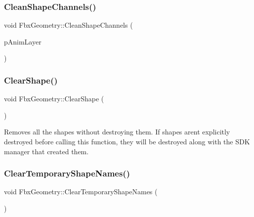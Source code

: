 \mbox{\label{class_fbx_geometry_ad7d877cff6187c93064395a71b25ecce}} 
\subsubsection{\texorpdfstring{Clean\+Shape\+Channels()}{CleanShapeChannels()}}
{\footnotesize\ttfamily void Fbx\+Geometry\+::\+Clean\+Shape\+Channels (\begin{DoxyParamCaption}\item[{\hyperlink{class_fbx_anim_layer}{Fbx\+Anim\+Layer} $\ast$}]{p\+Anim\+Layer }\end{DoxyParamCaption})}

\mbox{\label{class_fbx_geometry_a6f5e46228d45b12e4f513abb56b8226d}} 
\subsubsection{\texorpdfstring{Clear\+Shape()}{ClearShape()}}
{\footnotesize\ttfamily void Fbx\+Geometry\+::\+Clear\+Shape (\begin{DoxyParamCaption}{ }\end{DoxyParamCaption})}

Removes all the shapes without destroying them. If shapes aren\textquotesingle{}t explicitly destroyed before calling this function, they will be destroyed along with the S\+DK manager that created them. \mbox{\label{class_fbx_geometry_a2959da5506f3499fdb644a82843a64cd}} 
\subsubsection{\texorpdfstring{Clear\+Temporary\+Shape\+Names()}{ClearTemporaryShapeNames()}}
{\footnotesize\ttfamily void Fbx\+Geometry\+::\+Clear\+Temporary\+Shape\+Names (\begin{DoxyParamCaption}{ }\end{DoxyParamCaption})}

